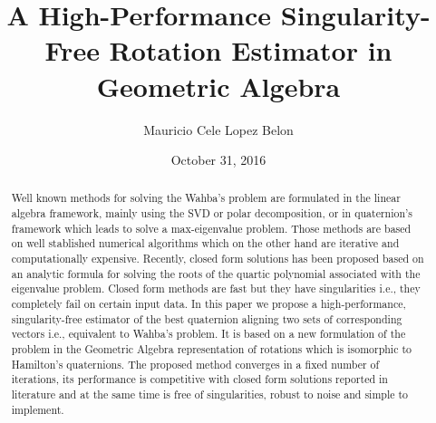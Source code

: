 \documentclass{birkjour}
\numberwithin{equation}{section}
\begin{document}
%
%
%
%
%
%
%
%
%


\title[A High-Performance Singularity-Free Rotation Estimator in Geometric Algebra]
 {A High-Performance Singularity-Free Rotation Estimator in Geometric Algebra}

\author[Mauricio Cele Lopez Belon]{Mauricio Cele Lopez Belon}
\address{Madrid, España}




\date{October 31, 2016}

\begin{abstract}

Well known methods for solving the Wahba's problem are formulated in the linear algebra framework, mainly using the SVD or polar decomposition, or in quaternion's framework which leads to solve a max-eigenvalue problem. Those methods are based on well stablished numerical algorithms which on the other hand are iterative and computationally expensive. Recently, closed form solutions has been proposed based on an analytic formula for solving the roots of the quartic polynomial associated with the eigenvalue problem. Closed form methods are fast but they have singularities i.e., they completely fail on certain input data. In this paper we propose a high-performance, singularity-free estimator of the best quaternion aligning two sets of corresponding vectors i.e., equivalent to Wahba's problem. It is based on a new formulation of the problem  in the Geometric Algebra representation of rotations which is isomorphic to Hamilton's quaternions.  The proposed method converges in a fixed number of iterations, its performance is competitive with closed form solutions reported in literature and at the same time is free of singularities, robust to noise and simple to implement.

\end{abstract}
\end{document}
